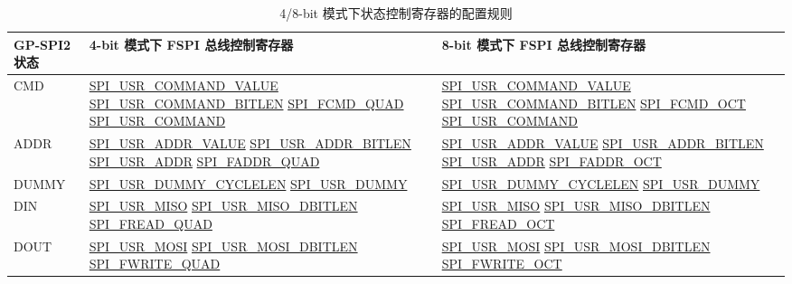 \documentclass[main\_\_CN.tex]{subfiles}
\begin{document}
\begin{longtable}[c]{ |L{3cm}|L{5.5cm}|L{5.2cm}| }
\caption{4/8-bit 模式下状态控制寄存器的配置规则}
\\\hline
{}
GP-SPI2 状态 & 4-bit 模式下 FSPI 总线控制寄存器  & 8-bit 模式下 FSPI 总线控制寄存器 \\\hline
\endhead
\label{table:SPI_USR2}
CMD  &\hyperref[fielddesc:SPIUSRCOMMANDVALUE]{SPI\_USR\_COMMAND\_VALUE}  \hyperref[fielddesc:SPIUSRCOMMANDBITLEN]{SPI\_USR\_COMMAND\_BITLEN}   \hyperref[fielddesc:SPIFCMDQUAD]{SPI\_FCMD\_QUAD}    \hyperref[fielddesc:SPIUSRCOMMAND]{SPI\_USR\_COMMAND}
     &\hyperref[fielddesc:SPIUSRCOMMANDVALUE]{SPI\_USR\_COMMAND\_VALUE}  \hyperref[fielddesc:SPIUSRCOMMANDBITLEN]{SPI\_USR\_COMMAND\_BITLEN}   \hyperref[fielddesc:SPIFCMDOCT]{SPI\_FCMD\_OCT}     \hyperref[fielddesc:SPIUSRCOMMAND]{SPI\_USR\_COMMAND}\\
     \hline
ADDR &\hyperref[fielddesc:SPIUSRADDRVALUE]{SPI\_USR\_ADDR\_VALUE}   \hyperref[fielddesc:SPIUSRADDRBITLEN]{SPI\_USR\_ADDR\_BITLEN}    \hyperref[fielddesc:SPIUSRADDR]{SPI\_USR\_ADDR}                \hyperref[fielddesc:SPIFADDRQUAD]{SPI\_FADDR\_QUAD}
     &\hyperref[fielddesc:SPIUSRADDRVALUE]{SPI\_USR\_ADDR\_VALUE}   \hyperref[fielddesc:SPIUSRADDRBITLEN]{SPI\_USR\_ADDR\_BITLEN}    \hyperref[fielddesc:SPIUSRADDR]{SPI\_USR\_ADDR}      \hyperref[fielddesc:SPIFADDROCT]{SPI\_FADDR\_OCT}\\
     \hline
DUMMY &\hyperref[fielddesc:SPIUSRDUMMYCYCLELEN]{SPI\_USR\_DUMMY\_CYCLELEN}     \hyperref[fielddesc:SPIUSRDUMMY]{SPI\_USR\_DUMMY}
     &\hyperref[fielddesc:SPIUSRDUMMYCYCLELEN]{SPI\_USR\_DUMMY\_CYCLELEN}     \hyperref[fielddesc:SPIUSRDUMMY]{SPI\_USR\_DUMMY}\\
     \hline
DIN  &\hyperref[fielddesc:SPIUSRMISO]{SPI\_USR\_MISO}  \hyperref[fielddesc:SPIUSRMISODBITLEN]{SPI\_USR\_MISO\_DBITLEN}  \hyperref[fielddesc:SPIFREADQUAD]{SPI\_FREAD\_QUAD}
     &\hyperref[fielddesc:SPIUSRMISO]{SPI\_USR\_MISO}  \hyperref[fielddesc:SPIUSRMISODBITLEN]{SPI\_USR\_MISO\_DBITLEN}  \hyperref[fielddesc:SPIFREADOCT]{SPI\_FREAD\_OCT}\\
     \hline
DOUT &\hyperref[fielddesc:SPIUSRMOSI]{SPI\_USR\_MOSI}       \hyperref[fielddesc:SPIUSRMOSIDBITLEN]{SPI\_USR\_MOSI\_DBITLEN}       \hyperref[fielddesc:SPIFWRITEQUAD]{SPI\_FWRITE\_QUAD}
     &\hyperref[fielddesc:SPIUSRMOSI]{SPI\_USR\_MOSI}       \hyperref[fielddesc:SPIUSRMOSIDBITLEN]{SPI\_USR\_MOSI\_DBITLEN}       \hyperref[fielddesc:SPIFWRITEOCT]{SPI\_FWRITE\_OCT}\\
     \hline
\end{longtable}
\end{document}
